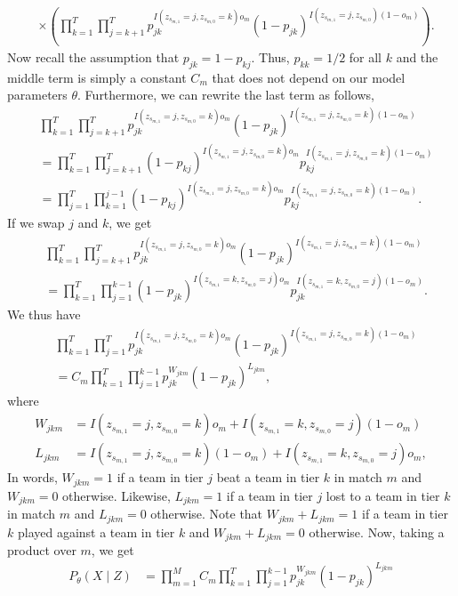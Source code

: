 \begin{enumerate}
\begin{align*}
		&\times \left(\prod_{k=1}^T\prod_{j=k+1}^{T}p_{jk}^{I(z_{s_{m,1}}=j,z_{s_{m,0}}=k)o_m}(1-p_{jk})^{I(z_{s_{m,1}}=j,z_{s_{m,0}})(1-o_m)}\right).
	\end{align*}
	Now recall the assumption that $p_{jk} = 1-p_{kj}$. Thus, $p_{kk}=1/2$ for all $k$ and the middle term is simply a constant $C_m$ that does not depend on our model parameters $\theta$. Furthermore, we can rewrite the last term as follows,
	\begin{align*}
		&\prod_{k=1}^T\prod_{j=k+1}^{T}p_{jk}^{I(z_{s_{m,1}}=j,z_{s_{m,0}}=k)o_m}(1-p_{jk})^{I(z_{s_{m,1}}=j,z_{s_{m,0}}=k)(1-o_m)}\\
		&=\prod_{k=1}^T\prod_{j=k+1}^T (1-p_{kj})^{I(z_{s_{m,1}}=j,z_{s_{m,0}}=k)o_m}p_{kj}^{I(z_{s_{m,1}}=j,z_{s_{m,0}}=k)(1-o_m)}\\
		&=\prod_{j=1}^T\prod_{k=1}^{j-1} (1-p_{kj})^{I(z_{s_{m,1}}=j,z_{s_{m,0}}=k)o_m}p_{kj}^{I(z_{s_{m,1}}=j,z_{s_{m,0}}=k)(1-o_m)}.
	\end{align*}
	If we swap $j$ and $k$, we get
	\begin{align*}
		&\prod_{k=1}^T\prod_{j=k+1}^{T}p_{jk}^{I(z_{s_{m,1}}=j,z_{s_{m,0}}=k)o_m}(1-p_{jk})^{I(z_{s_{m,1}}=j,z_{s_{m,0}}=k)(1-o_m)}\\
		&= \prod_{k=1}^T\prod_{j=1}^{k-1} (1-p_{jk})^{I(z_{s_{m,1}}=k,z_{s_{m,0}}=j)o_m}p_{jk}^{I(z_{s_{m,1}}=k,z_{s_{m,0}}=j)(1-o_m)}.
	\end{align*}
	We thus have
	\begin{align*}
		&\prod_{k=1}^T\prod_{j=1}^Tp_{jk}^{I(z_{s_{m,1}}=j,z_{s_{m,0}}=k)o_m}(1-p_{jk})^{I(z_{s_{m,1}}=j,z_{s_{m,0}}=k)(1-o_m)}\\
		&=C_m\prod_{k=1}^T\prod_{j=1}^{k-1} p_{jk}^{W_{jkm}}(1-p_{jk})^{L_{jkm}},
	\end{align*}
	where
	\begin{align*}
		W_{jkm}&=I(z_{s_{m,1}}=j,z_{s_{m,0}}=k)o_m + I(z_{s_{m,1}}=k,z_{s_{m,0}}=j)(1-o_m)\\
		L_{jkm}&=I(z_{s_{m,1}}=j,z_{s_{m,0}}=k)(1-o_m) + I(z_{s_{m,1}}=k,z_{s_{m,0}}=j)o_m,
	\end{align*}
	In words, $W_{jkm}=1$ if a team in tier $j$ beat a team in tier $k$ in match $m$ and $W_{jkm}=0$ otherwise. Likewise, $L_{jkm}=1$ if a team in tier $j$ lost to a team in tier $k$ in match $m$ and $L_{jkm}=0$ otherwise. Note that $W_{jkm}+L_{jkm}=1$ if a team in tier $k$ played against a team in tier $k$ and $W_{jkm}+L_{jkm}=0$ otherwise. Now, taking a product over $m$, we get
	\begin{align*}
		P_\theta(X \mid Z)&=\prod_{m=1}^MC_m\prod_{k=1}^T\prod_{j=1}^{k-1} p_{jk}^{W_{jkm}}(1-p_{jk})^{L_{jkm}}\\

\end{align*}
\end{enumerate}
